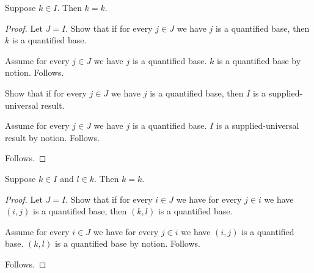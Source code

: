 

\begin{theorem}\label{universal_alias_source}
    Suppose $k\in I$.
    Then $k=k$.
\end{theorem}
\begin{proof}
    Let $J=I$.
    Show that if for every $j\in J$ we have $j$ is a quantified base,
        then $k$ is a quantified base.
    \begin{subproof}
        Assume for every $j\in J$ we have $j$ is a quantified base.
        $k$ is a quantified base by notion.
        Follows.
    \end{subproof}
    Show that if for every $j\in J$ we have $j$ is a quantified base,
        then $I$ is a supplied-universal result.
    \begin{subproof}
        Assume for every $j\in J$ we have $j$ is a quantified base.
        $I$ is a supplied-universal result by notion.
        Follows.
    \end{subproof}
    Follows.
\end{proof}

\begin{theorem}\label{universal_alias_dependent_source}
    Suppose $k\in I$ and $l\in k$.
    Then $k=k$.
\end{theorem}
\begin{proof}
    Let $J=I$.
    Show that if for every $i\in J$ we have for every $j\in i$
        we have $(i,j)$ is a quantified base, then $(k,l)$ is a quantified base.
    \begin{subproof}
        Assume for every $i\in J$ we have for every $j\in i$
            we have $(i,j)$ is a quantified base.
        $(k,l)$ is a quantified base by notion.
        Follows.
    \end{subproof}
    Follows.
\end{proof}
